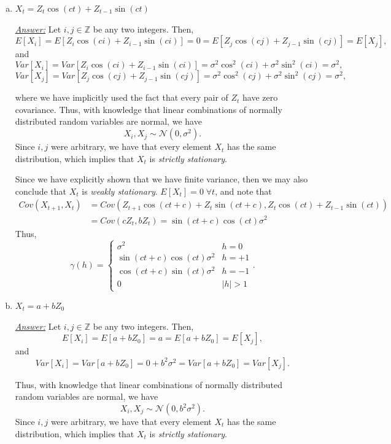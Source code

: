\documentclass[a4paper, 11pt]{article}
\begin{document}
\begin{itemize}
\begin{enumerate}[(a)]
		\item $X_t = Z_t\cos(ct) + Z_{t-1}\sin(ct)$ \newline 
		
			\underline{\emph{Answer:}} Let $i,j \in \mathbb{Z}$ be any two integers. Then, 
			$$E[X_i] = E[Z_i\cos(ci) + Z_{i-1}\sin(ci)] = 0 = E[Z_j\cos(cj) + Z_{j-1}\sin(cj)] = E[X_j],$$
			and
			$$Var[X_i] = Var[Z_i\cos(ci) + Z_{i-1}\sin(ci)] = \sigma^2\cos^2(ci) + \sigma^2\sin^2(ci) = \sigma^2, $$
			$$Var[X_j] = Var[Z_j\cos(cj) + Z_{j-1}\sin(cj)] = \sigma^2\cos^2(cj) + \sigma^2\sin^2(cj) = \sigma^2, $$

where we have implicitly used the fact that every pair of $Z_t$ have zero covariance. Thus, with knowledge that linear combinations of normally distributed random variables are normal, we have 
$$X_i,X_j \sim \mathcal{N}(0,\sigma^2) .$$
Since $i,j$ were arbitrary, we have that every element $X_t$ has the same distribution, which implies that $X_t$ is \emph{strictly stationary}.  \newline 

Since we have explicitly shown that we have finite variance, then we may also conclude that $X_t$ is \emph{weakly stationary}. $E[X_t] = 0 \; \forall t$, and note that 
\begin{align*}
Cov(X_{t+1},X_t) & = Cov(Z_{t+1}\cos(ct+c) + Z_{t}\sin(ct+c),Z_t\cos(ct) + Z_{t-1}\sin(ct) ) \\
& = Cov(cZ_t,bZ_t) = \sin(ct+c)\cos(ct)\sigma^2
\end{align*}
Thus, 
$$\gamma(h) = \left\{\begin{array}{cc} \sigma^2 & h = 0 \\ \sin(ct+c)\cos(ct)\sigma^2 & h= + 1 \\ \cos(ct+c)\sin(ct)\sigma^2 & h= - 1 \\ 0 & |h|>1 \end{array}\right. .$$
 

		\item $X_t = a + bZ_0$ \newline 
		
			\underline{\emph{Answer:}} Let $i,j \in \mathbb{Z}$ be any two integers. Then, 
			$$E[X_i] = E[a + bZ_0] = a = E[a + bZ_0] = E[X_j],$$
			and
			$$Var[X_i] = Var[a + bZ_0] = 0 + b^2\sigma^2 = Var[a + bZ_0] = Var[X_j].$$

Thus, with knowledge that linear combinations of normally distributed random variables are normal, we have 
$$X_i,X_j \sim \mathcal{N}(0,b^2\sigma^2) .$$
Since $i,j$ were arbitrary, we have that every element $X_t$ has the same distribution, which implies that $X_t$ is \emph{strictly stationary}. \newline 


\end{enumerate}
\end{itemize}
\end{document}
